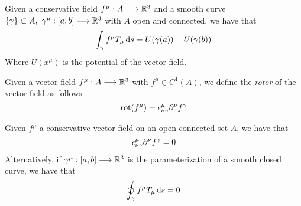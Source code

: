\documentclass[../complete.tex]{subfiles}
\begin{document}
\begin{thm}
	Given a conservative field $f^\mu:A\overset{}{\longrightarrow}\mathbb{R}^3$ and a smooth curve $\{\gamma\}\subset A,\ \gamma^\mu:[a,b]\fto\R^3$ with $A$ open and connected, we have that
	\begin{equation}
		\int_{\gamma}^{}f^\mu T_\mu\operatorname{d\!} s=U(\gamma(a))-U(\gamma(b))
		\label{eq:consfieldint}
	\end{equation}
	Where $U(x^\mu)$ is the potential of the vector field.
\end{thm}
\begin{dfn}[Rotor]
	Given a vector field $f^\mu:A\overset{}{\longrightarrow}\mathbb{R}^3$ with $f^\mu\in C^1(A)$, we define the \textit{rotor} of the vector field as follows
	\begin{equation}
		\operatorname{rot}(f^\mu)=\epsilon^\mu_{\nu\gamma}\partial^\nu f^\gamma
		\label{eq:rotor}
	\end{equation}
\end{dfn}
\begin{thm}
	Given $f^\mu$ a conservative vector field on an open connected set $A$, we have that
	\begin{equation}
		\epsilon^{\mu}_{\nu\gamma}\partial^\nu f^\gamma=0
		\label{eq:nullrotor}
	\end{equation}
	Alternatively, if $\gamma^\mu:[a,b]\overset{}{\longrightarrow}\mathbb{R}^3$ is the parameterization of a smooth closed curve, we have that
	\begin{equation}
		\oint_\gamma f^\mu T_\mu\operatorname{d\!} s=0
		\label{eq:lineintcloscons}
	\end{equation}
\end{thm}
\end{document}
